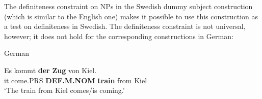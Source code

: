 
The definiteness constraint on NPs in the Swedish dummy subject construction (which is similar to the English one) makes it possible to use this construction as a test on definiteness in Swedish. The definiteness constraint is not universal, however; it does not hold for the corresponding constructions in German:


\item 

German



 \ea\label{}
\gll Es  kommt  \textbf{der}\textbf{  Zug} von  Kiel.\\


it  come.PRS  \textbf{DEF.M.NOM} \textbf{train} from  Kiel\\

\glt ‘The train from Kiel comes/is coming.’

\z


